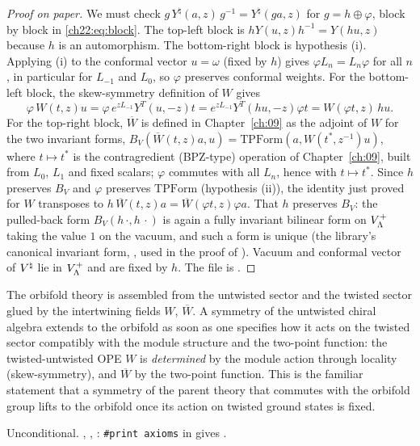 \begin{proof}[Proof on paper]
We must check $g\,Y^\natural(a,z)\,g^{-1}=Y^\natural(ga,z)$ for $g=h\oplus\varphi$, block by block in
\eqref{ch22:eq:block}.  The top-left block is $hY(u,z)h^{-1}=Y(hu,z)$ because $h$ is an automorphism.  The
bottom-right block is hypothesis (i).  Applying (i) to the conformal vector $u=\omega$ (fixed by $h$) gives
$\varphi L_n=L_n\varphi$ for all $n$, in particular for $L_{-1}$ and $L_0$, so $\varphi$ preserves conformal weights.
For the bottom-left block, the skew-symmetry definition of $W$ gives
\begin{equation*}
  \varphi\,W(t,z)u=\varphi\,e^{zL_{-1}}Y^T(u,-z)t=e^{zL_{-1}}Y^T(hu,-z)\varphi t=W(\varphi t,z)\,hu.
\end{equation*}
For the top-right block, $\overline W$ is defined in Chapter~\ref{ch:09} as the adjoint of $W$ for the two
invariant forms, $B_V(\overline W(t,z)a,u)=\mathrm{TPForm}(a,W(t^*,z^{-1})u)$, where $t\mapsto t^*$ is the
contragredient (BPZ-type) operation of Chapter~\ref{ch:09}, built from $L_0$, $L_1$ and fixed scalars; $\varphi$ commutes
with all $L_n$, hence with $t\mapsto t^*$.  Since $h$ preserves $B_V$ and $\varphi$ preserves
$\mathrm{TPForm}$ (hypothesis (ii)), the identity just proved for $W$ transposes to
$h\,\overline W(t,z)a=\overline W(\varphi t,z)\varphi a$.  That $h$ preserves $B_V$: the pulled-back form $B_V(h\,\cdot,h\,\cdot)$ is again a fully invariant
bilinear form on $V_{\Lambda}^+$ taking the value $1$ on the vacuum, and such a form is unique (the library's canonical
invariant form, , used in the proof of ).  Vacuum and conformal vector of ${V^{\natural}}$ lie in $V_{\Lambda}^+$ and are fixed by
$h$.  The file is .
\end{proof}
\begin{physics}
The orbifold theory is assembled from the untwisted sector and the twisted sector glued by the intertwining
fields $W$, $\overline W$.  A symmetry of the untwisted chiral algebra extends to the orbifold as soon as one specifies
how it acts on the twisted sector compatibly with the module structure and the two-point function: the
twisted-untwisted OPE $W$ is \emph{determined} by the module action through locality (skew-symmetry), and
$\overline W$ by the two-point function.  This is the familiar statement that a symmetry of the parent theory that
commutes with the orbifold group lifts to the orbifold once its action on twisted ground states is fixed.
\end{physics}
\begin{status}
Unconditional.  , , : \texttt{\#print axioms} in
 gives .
\end{status}

